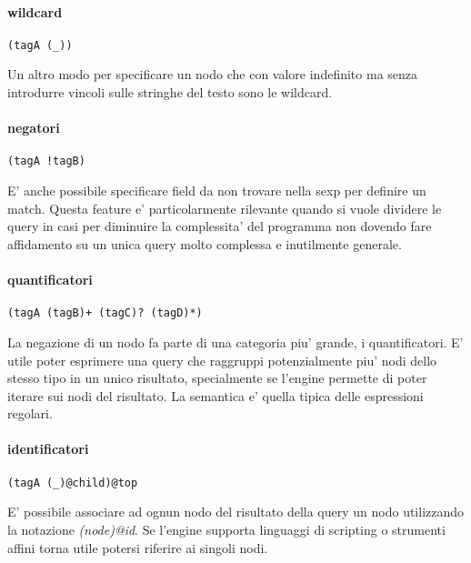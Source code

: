\paragraph{wildcard}

\begin{verbatim}
(tagA (_))
\end{verbatim}

Un altro modo per specificare un nodo che con valore indefinito ma senza introdurre vincoli sulle stringhe del testo sono le wildcard.

\paragraph{negatori}

\begin{verbatim}
(tagA !tagB)
\end{verbatim}

E' anche possibile specificare field da non trovare nella sexp per definire un match.
Questa feature e' particolarmente rilevante quando si vuole dividere le query in casi per diminuire la complessita' del programma non dovendo fare affidamento su un unica query molto complessa e inutilmente generale.

\paragraph{quantificatori}

\begin{verbatim}
(tagA (tagB)+ (tagC)? (tagD)*)
\end{verbatim}

La negazione di un nodo fa parte di una categoria piu' grande, i quantificatori.
E' utile poter esprimere una query che raggruppi potenzialmente piu' nodi dello stesso tipo in un unico risultato, specialmente se l'engine permette di poter iterare sui nodi del risultato.
La semantica e' quella tipica delle espressioni regolari.

\paragraph{identificatori}

\begin{verbatim}
(tagA (_)@child)@top
\end{verbatim}

E' possibile associare ad ognun nodo del risultato della query un nodo utilizzando la notazione \emph{(node)@id}.
Se l'engine supporta linguaggi di scripting o strumenti affini torna utile potersi riferire ai singoli nodi.

